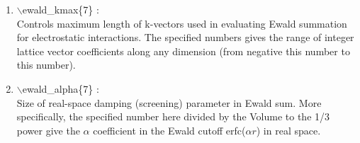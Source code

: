 \documentclass[12pt,titlepage]{article}
\begin{document}
\begin{enumerate}

 \vspace{0.15in} 
 \item   $\backslash$ewald\_kmax\{7\} : \\
  Controls maximum length of k-vectors used in evaluating Ewald summation for 
  electrostatic interactions.  The specified numbers gives the range of integer lattice vector coefficients along any dimension (from negative this number to this number).

 \vspace{0.15in} 
 \item   $\backslash$ewald\_alpha\{7\} : \\
  Size of real-space damping (screening) parameter in Ewald sum.  More specifically, the specified number here divided by the Volume to the 1/3 power give the $\alpha$ coefficient in the Ewald cutoff erfc($\alpha r$) in real space.

%
%
%
%
%
%


\end{enumerate}
\end{document}
